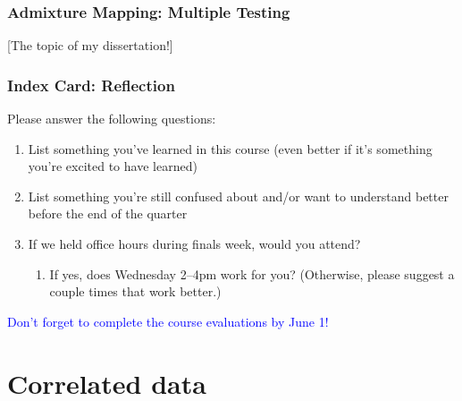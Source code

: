 \documentclass[12pt, 
hyperref={colorlinks=true, linkcolor=blue, urlcolor=cyan},dvipsnames]{beamer}
\begin{document}
\begin{frame}
\frametitle{Admixture Mapping: Multiple Testing}

[The topic of my dissertation!]

\end{frame}



\begin{frame}
\frametitle{Index Card: Reflection}

Please answer the following questions:
\begin{enumerate}
\item List something you've learned in this course (even better if it's something you're excited to have learned)
\item List something you're still confused about and/or want to understand better before the end of the quarter
\item If we held office hours during finals week, would you attend?
	\begin{enumerate}
	\item If yes, does Wednesday 2--4pm work for you? (Otherwise, please suggest a couple times that work better.)
	\end{enumerate}
\end{enumerate}

\textcolor{blue}{Don't forget to complete the course evaluations by June 1!}

\end{frame}


\section{Correlated data}
\end{document}
